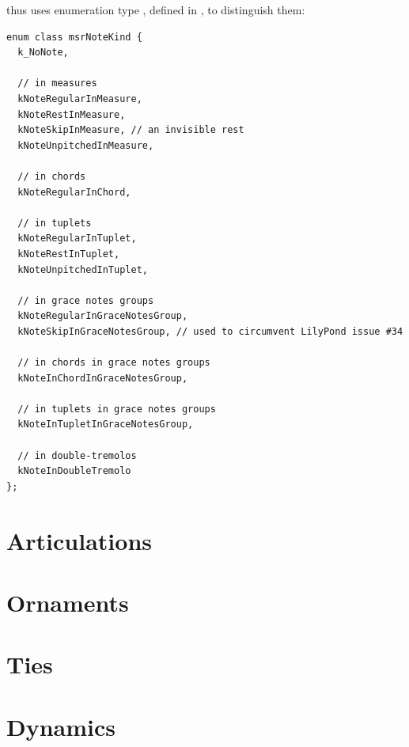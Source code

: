  thus uses enumeration type , defined in , to distinguish them:
\begin{lstlisting}[language=CPlusPlus]
enum class msrNoteKind {
  k_NoNote,

  // in measures
  kNoteRegularInMeasure,
  kNoteRestInMeasure,
  kNoteSkipInMeasure, // an invisible rest
  kNoteUnpitchedInMeasure,

  // in chords
  kNoteRegularInChord,

  // in tuplets
  kNoteRegularInTuplet,
  kNoteRestInTuplet,
  kNoteUnpitchedInTuplet,

  // in grace notes groups
  kNoteRegularInGraceNotesGroup,
  kNoteSkipInGraceNotesGroup, // used to circumvent LilyPond issue #34

  // in chords in grace notes groups
  kNoteInChordInGraceNotesGroup,

  // in tuplets in grace notes groups
  kNoteInTupletInGraceNotesGroup,

  // in double-tremolos
  kNoteInDoubleTremolo
};
\end{lstlisting}


\section{Articulations}\label{Articulations}


\section{Ornaments}\label{Ornaments}


\section{Ties}\label{Ties}


\section{Dynamics}\label{Dynamics}


